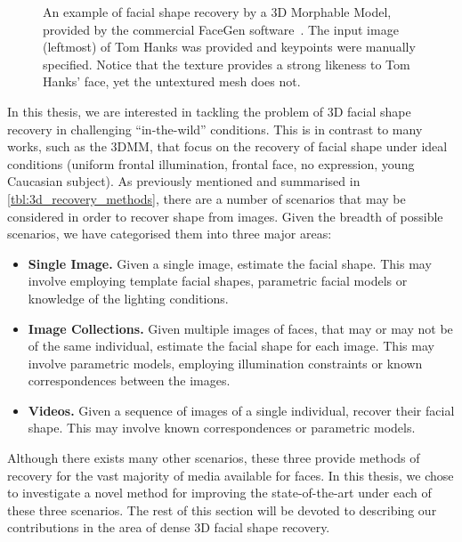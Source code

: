 \begin{figure}[t]
	\hspace*{\fill}
	\caption{An example of facial shape recovery by a 3D Morphable Model, 
	         provided by the commercial FaceGen software~\cite{facegen}. The
	         input image (leftmost) of Tom Hanks was provided and keypoints were
	         manually specified. Notice that the texture provides a strong 
	         likeness to Tom Hanks' face, yet the untextured mesh does not.}
\label{fig:facegen_tom_hanks}
\end{figure}

In this thesis, we are interested in tackling the problem of 3D facial shape
recovery in challenging ``in-the-wild'' conditions. This is in contrast
to many works, such as the 3DMM, that focus on the recovery of facial shape
under ideal conditions (uniform frontal illumination, frontal face,
no expression, young Caucasian subject). As previously mentioned and summarised
in \cref{tbl:3d_recovery_methods}, there are 
a number of scenarios that may be considered in order to recover shape from
images. Given the breadth of possible scenarios, we have categorised them into
three major areas:
\begin{itemize}
	\item \textbf{Single Image.} Given a single image, estimate the facial 
	      shape. This may involve employing template facial shapes, parametric
	      facial models or knowledge of the lighting conditions. 
	\item \textbf{Image Collections.} Given multiple images of faces, that may
	      or may not be of the same individual, estimate the facial shape for
	      each image. This may involve parametric models, employing illumination
	      constraints or known correspondences between the images.
	\item \textbf{Videos.} Given a sequence of images of a single individual,
	      recover their facial shape. This may involve known correspondences or
	      parametric models.
\end{itemize}
Although there exists many other scenarios, these three provide methods of
recovery for the vast majority of media available for faces. In this thesis, we
chose to investigate a novel method for improving the state-of-the-art under
each of these three scenarios. The rest of this section will be devoted to
describing our contributions in the area of dense 3D facial shape recovery.
